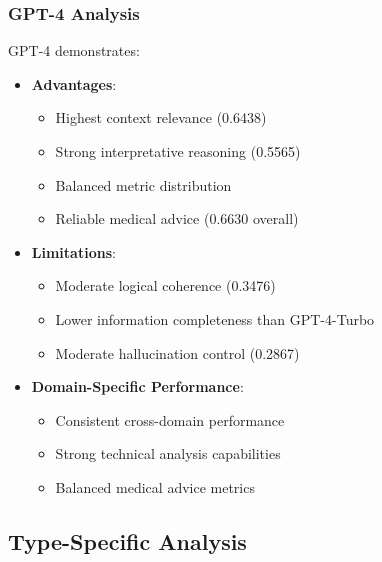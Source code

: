 \subsubsection{GPT-4 Analysis}
GPT-4 demonstrates:
\begin{itemize}
    \item \textbf{Advantages}:
    \begin{itemize}
        \item Highest context relevance (0.6438)
        \item Strong interpretative reasoning (0.5565)
        \item Balanced metric distribution
        \item Reliable medical advice (0.6630 overall)
    \end{itemize}
    \item \textbf{Limitations}:
    \begin{itemize}
        \item Moderate logical coherence (0.3476)
        \item Lower information completeness than GPT-4-Turbo
        \item Moderate hallucination control (0.2867)
    \end{itemize}
    \item \textbf{Domain-Specific Performance}:
    \begin{itemize}
        \item Consistent cross-domain performance
        \item Strong technical analysis capabilities
        \item Balanced medical advice metrics
    \end{itemize}
\end{itemize}

\subsection{Type-Specific Analysis}

